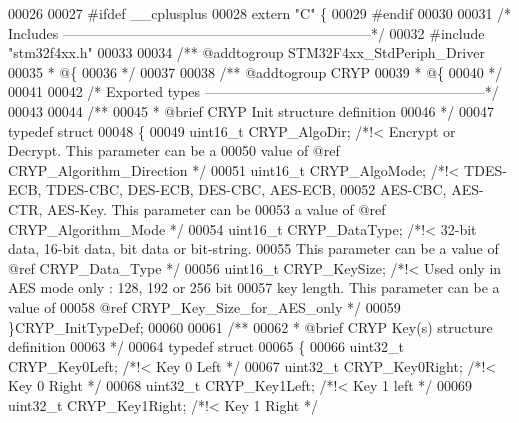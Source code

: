 \begin{DoxyCode}
00026 
00027 \textcolor{preprocessor}{#}\textcolor{preprocessor}{ifdef} \_\_cplusplus
00028  \textcolor{keyword}{extern} \textcolor{stringliteral}{"C"} \{
00029 \textcolor{preprocessor}{#}\textcolor{preprocessor}{endif}
00030 
00031 \textcolor{comment}{/* Includes ------------------------------------------------------------------*/}
00032 \textcolor{preprocessor}{#}\textcolor{preprocessor}{include} "stm32f4xx.h"
00033 
00034 \textcolor{comment}{/** @addtogroup STM32F4xx\_StdPeriph\_Driver}
00035 \textcolor{comment}{  * @\{}
00036 \textcolor{comment}{  */}
00037 
00038 \textcolor{comment}{/** @addtogroup CRYP}
00039 \textcolor{comment}{  * @\{}
00040 \textcolor{comment}{  */}
00041 
00042 \textcolor{comment}{/* Exported types ------------------------------------------------------------*/}
00043 
00044 \textcolor{comment}{/** }
00045 \textcolor{comment}{  * @brief   CRYP Init structure definition  }
00046 \textcolor{comment}{  */}
00047 \textcolor{keyword}{typedef} \textcolor{keyword}{struct}
00048 \{
00049   uint16\_t CRYP_AlgoDir;   \textcolor{comment}{/*!< Encrypt or Decrypt. This parameter can be a }
00050 \textcolor{comment}{                                value of @ref CRYP\_Algorithm\_Direction */}
00051   uint16\_t CRYP_AlgoMode;  \textcolor{comment}{/*!< TDES-ECB, TDES-CBC, DES-ECB, DES-CBC, AES-ECB, }
00052 \textcolor{comment}{                                AES-CBC, AES-CTR, AES-Key. This parameter can be}
00053 \textcolor{comment}{                                a value of @ref CRYP\_Algorithm\_Mode */}
00054   uint16\_t CRYP_DataType;  \textcolor{comment}{/*!< 32-bit data, 16-bit data, bit data or bit-string.}
00055 \textcolor{comment}{                                This parameter can be a value of @ref CRYP\_Data\_Type */}
00056   uint16\_t CRYP_KeySize;   \textcolor{comment}{/*!< Used only in AES mode only : 128, 192 or 256 bit }
00057 \textcolor{comment}{                                key length. This parameter can be a value of }
00058 \textcolor{comment}{                                @ref CRYP\_Key\_Size\_for\_AES\_only */}
00059 \}CRYP\_InitTypeDef;
00060 
00061 \textcolor{comment}{/** }
00062 \textcolor{comment}{  * @brief   CRYP Key(s) structure definition  }
00063 \textcolor{comment}{  */}
00064 \textcolor{keyword}{typedef} \textcolor{keyword}{struct}
00065 \{
00066   uint32\_t CRYP_Key0Left;  \textcolor{comment}{/*!< Key 0 Left  */}
00067   uint32\_t CRYP_Key0Right; \textcolor{comment}{/*!< Key 0 Right */}
00068   uint32\_t CRYP_Key1Left;  \textcolor{comment}{/*!< Key 1 left  */}
00069   uint32\_t CRYP_Key1Right; \textcolor{comment}{/*!< Key 1 Right */}

\end{DoxyCode}

